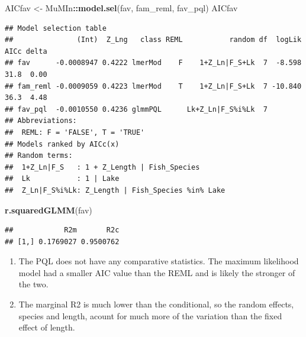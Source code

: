 \documentclass[
]{article}
\newenvironment{Shaded}{\begin{snugshade}}{\end{snugshade}}
\newcommand{\FunctionTok}[1]{\textcolor[rgb]{0.13,0.29,0.53}{\textbf{#1}}}
\newcommand{\NormalTok}[1]{#1}
\newcommand{\OtherTok}[1]{\textcolor[rgb]{0.56,0.35,0.01}{#1}}
\newcommand{\SpecialCharTok}[1]{\textcolor[rgb]{0.81,0.36,0.00}{\textbf{#1}}}
\begin{document}
\begin{Shaded}
\begin{Highlighting}[]
\NormalTok{AICfav  }\OtherTok{\textless{}{-}}\NormalTok{ MuMIn}\SpecialCharTok{::}\FunctionTok{model.sel}\NormalTok{(fav, fam\_reml, fav\_pql)}
\NormalTok{AICfav}
\end{Highlighting}
\end{Shaded}

\begin{verbatim}
## Model selection table 
##               (Int)  Z_Lng   class REML           random df  logLik AICc delta
## fav      -0.0008947 0.4222 lmerMod    F    1+Z_Ln|F_S+Lk  7  -8.598 31.8  0.00
## fam_reml -0.0009059 0.4223 lmerMod    T    1+Z_Ln|F_S+Lk  7 -10.840 36.3  4.48
## fav_pql  -0.0010550 0.4236 glmmPQL      Lk+Z_Ln|F_S%i%Lk  7                   
## Abbreviations:
##  REML: F = 'FALSE', T = 'TRUE'
## Models ranked by AICc(x) 
## Random terms: 
##  1+Z_Ln|F_S   : 1 + Z_Length | Fish_Species
##  Lk           : 1 | Lake
##  Z_Ln|F_S%i%Lk: Z_Length | Fish_Species %in% Lake
\end{verbatim}

\begin{Shaded}
\begin{Highlighting}[]
\FunctionTok{r.squaredGLMM}\NormalTok{(fav) }
\end{Highlighting}
\end{Shaded}

\begin{verbatim}
##            R2m       R2c
## [1,] 0.1769027 0.9500762
\end{verbatim}

\begin{enumerate}
\def\labelenumi{\arabic{enumi})}
\item
  The PQL does not have any comparative statistics. The maximum
  likelihood model had a smaller AIC value than the REML and is likely
  the stronger of the two.
\item
  The marginal R2 is much lower than the conditional, so the random
  effects, species and length, acount for much more of the variation
  than the fixed effect of length.
\end{enumerate}
\end{document}
